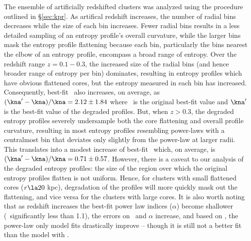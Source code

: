 \documentclass{emulateapj}
\begin{document}
The ensemble of artificially redshifted clusters was analyzed using
the procedure outlined in \S\ref{sec:kpr}. As artifical redshift
increases, the number of radial bins decreases while the size of each
bin increases. Fewer radial bins results in a less detailed sampling
of an entropy profile's overall curvature, while the larger bins mask
the entropy profile flattening because each bin, particularly the bins
nearest the elbow of an entropy profile, encompass a broad range of
entropy. Over the redshift range $z = 0.1-0.3$, the increased size of
the radial bins (and hence broader range of entropy per bin)
dominates, resulting in entropy profiles which have obvious flattened
cores, but the entropy measured in each bin has
increased. Consequently, best-fit \kna\ also increases, on average, as
$\dkna = 2.12 \pm 1.84$ where \kna\ is the original best-fit value and
$\kna^{\prime}$ is the best-fit value of the degraded profiles. But,
when $z > 0.3$, the degraded entropy profiles severely undersample
both the core flattening and overall profile curvature, resulting in
most entropy profiles resembling power-laws with a centralmost bin
that deviates only slightly from the power-law at larger radii. This
translates into a modest increase of best-fit \kna\ which, on average,
is $\dkna = 0.71 \pm 0.57$. However, there is a caveat to our analysis
of the degraded entropy profiles: the size of the region over which
the original entropy profiles flatten is not uniform. Hence, for
clusters with small flattened cores ($r \la 20$ kpc), degradation of
the profiles will more quickly mask out the flattening, and vice versa
for the clusters with large cores. It is also worth noting that as
redshift increases the best-fit power law indices ($\alpha$) become
shallower (\ie\ significantly less than 1.1), the errors on \kna\ and
$\alpha$ increase, and based on \chisq, the power-law only model fits
drastically improve -- though it is still not a better fit than the
model with \kna.
\end{document}
